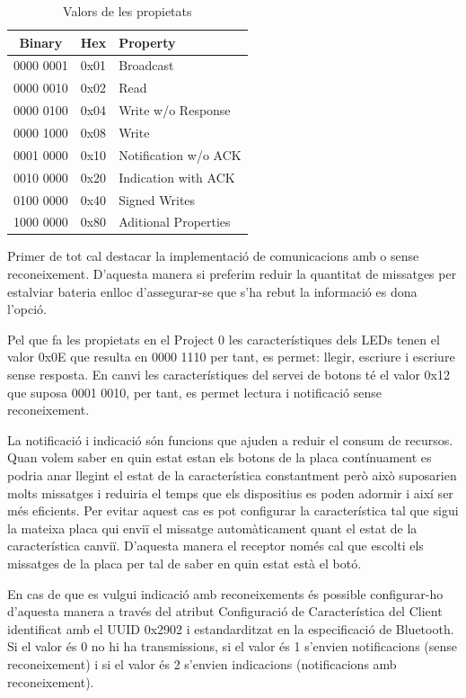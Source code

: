 \begin{table}
	\begin{center}
		\begin{tabular}{|c|c|l|}
			\hline
			Binary	&	Hex		&	Property	\\	\hline
			0000 0001	&	0x01	&	Broadcast\\	\hline
			0000 0010	&	0x02	&	Read	\\	\hline
			0000 0100	&	0x04	&	Write w/o Response	\\	\hline
			0000 1000	&	0x08	&	Write	\\	\hline
			0001 0000	&	0x10	&	Notification w/o ACK	\\	\hline
			0010 0000	&	0x20	&	Indication with ACK	\\	\hline
			0100 0000	&	0x40	&	Signed Writes	\\	\hline
			1000 0000	&	0x80	&	Aditional Properties	\\	\hline
		\end{tabular}
	\end{center}
\caption{Valors de les propietats}
\end{table}


Primer de tot cal destacar la implementació de comunicacions amb o sense reconeixement. D'aquesta manera si preferim reduir la quantitat de missatges per estalviar bateria enlloc d'assegurar-se que s'ha rebut la informació es dona l'opció.

Pel que fa les propietats en el Project 0 les característiques dels LEDs tenen el valor 0x0E que resulta en 0000 1110 per tant, es permet: llegir, escriure i escriure sense resposta.
En canvi les característiques del servei de botons té el valor 0x12 que suposa 0001 0010, per tant, es permet lectura i notificació sense reconeixement.

La notificació i indicació són funcions que ajuden a reduir el consum de recursos.
Quan volem saber en quin estat estan els botons de la placa contínuament es podria anar llegint el estat de la característica constantment però això suposarien molts missatges i reduiria el temps que els dispositius es poden adormir i així ser més eficients.
Per evitar aquest cas es pot configurar la característica tal que sigui la mateixa placa qui enviï el missatge automàticament quant el estat de la característica canviï.
D'aquesta manera el receptor només cal que escolti els missatges de la placa per tal de saber en quin estat està el botó.

En cas de que es vulgui indicació amb reconeixements és possible configurar-ho d'aquesta manera a través del atribut Configuració de Característica del Client identificat amb el UUID 0x2902 i estandarditzat en la especificació de Bluetooth.
Si el valor és 0 no hi ha transmissions, si el valor és 1 s'envien notificacions (sense reconeixement) i si el valor és 2 s'envien indicacions (notificacions amb reconeixement). 

